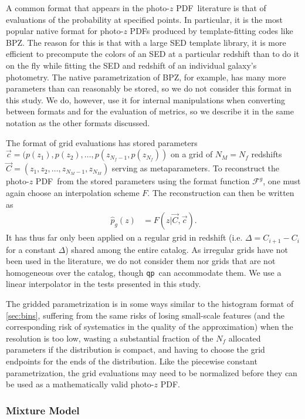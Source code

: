 \documentclass[\docopts]{\docclass}
\newcommand{\qp}{\texttt{qp}}
\newcommand{\pz}{photo-$z$ PDF}
\begin{document}
A common format that appears in the \pz\ literature is that of evaluations of 
the probability at specified points.  In particular, it is the most popular 
native format for \pz s produced by template-fitting codes like BPZ.  
\citep{benitez_bayesian_2000}  The reason for this is that with a large SED 
template library, it is more efficient to precompute the colors of an SED at a 
particular redshift than to do it on the fly while fitting the SED and redshift 
of an individual galaxy's photometry.  The native parametrization of BPZ, for 
example, has many more parameters than can reasonably be stored, so we do not 
consider this format in this study.  We do, however, use it for internal 
manipulations when converting between formats and for the evaluation of 
metrics, so we describe it in the same notation as the other formats discussed.

The format of grid evaluations has stored parameters $\vec{c}=(p(z_{1}), 
p(z_{2}), \dots, p(z_{N_{f}-1}, p(z_{N_{f}}))$ on a grid of $N_{M}=N_{f}$ 
redshifts $\vec{C}=(z_{1}, z_{2}, \dots, z_{N_{M}-1}, z_{N_{M}})$ serving as 
metaparameters.  To reconstruct the \pz\ from the stored parameters using the 
format function $\mathcal{F}^{g}$, one must again choose an interpolation 
scheme $F$.  The reconstruction can then be written as
\begin{align}
  \label{eq:gridded}
  \hat{p}_{g}(z) &= F(z| \vec{C}, \vec{c}).
\end{align}
It has thus far only been applied on a regular grid in redshift (i.e. 
$\Delta=C_{i+1}-C_{i}$ for a constant $\Delta$) shared among the entire 
catalog.  As irregular grids have not been used in the literature, we do not 
consider them nor grids that are not homogeneous over the catalog, though \qp\ 
can accommodate them.  We use a linear interpolator in the tests presented in 
this study.

The gridded parametrization is in some ways similar to the histogram format of 
\ref{sec:bins}, suffering from the same risks of losing small-scale features 
(and the corresponding risk of systematics in the quality of the approximation) 
when the resolution is too low, wasting a substantial fraction of the $N_{f}$ 
allocated parameters if the distribution is compact, and having to choose the 
grid endpoints for the ends of the distribution.  Like the piecewise constant 
parametrization, the grid evaluations may need to be normalized before they can 
be used as a mathematically valid \pz.

\subsubsection{Mixture Model}
\label{sec:mm}
\end{document}

